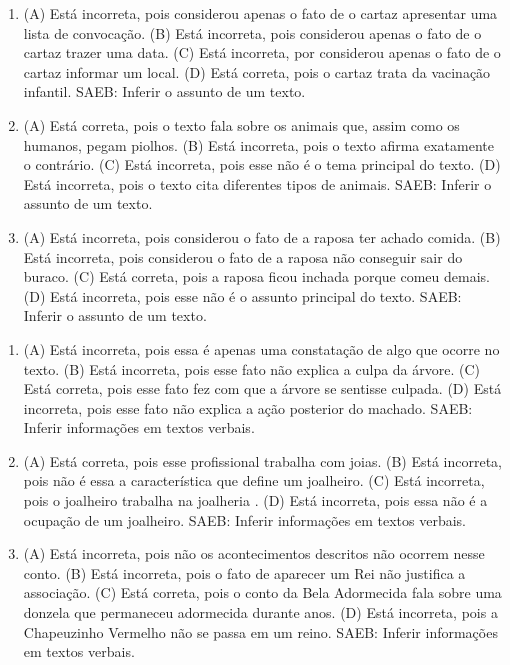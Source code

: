 
\begin{enumerate}
\item
(A) Está incorreta, pois considerou apenas o fato de o cartaz apresentar uma lista de convocação.
(B) Está incorreta, pois considerou apenas o fato de o cartaz trazer uma data.
(C) Está incorreta, por considerou apenas o fato de o cartaz informar um local.
(D) Está correta, pois o cartaz trata da vacinação infantil.
SAEB: Inferir o assunto de um texto.

\item
(A) Está correta, pois o texto fala sobre os animais que, assim como os humanos, pegam piolhos.
(B) Está incorreta, pois o texto afirma exatamente o contrário.
(C) Está incorreta, pois esse não é o tema principal do texto.
(D) Está incorreta, pois o texto cita diferentes tipos de animais.
SAEB: Inferir o assunto de um texto.

\item
(A) Está incorreta, pois considerou o fato de a raposa ter achado comida.
(B) Está incorreta, pois considerou o fato de a raposa não conseguir
sair do buraco.
(C) Está correta, pois a raposa ficou inchada porque comeu demais.
(D) Está incorreta, pois esse não é o assunto principal do texto.
SAEB: Inferir o assunto de um texto.
\end{enumerate}


\begin{enumerate}
\item
(A) Está incorreta, pois essa é apenas uma constatação de algo que ocorre no texto.
(B) Está incorreta, pois esse fato não explica a culpa da árvore.
(C) Está correta, pois esse fato fez com que a árvore se sentisse culpada.
(D) Está incorreta, pois esse fato não explica a ação posterior do machado.
SAEB: Inferir informações em textos verbais.

\item
(A) Está correta, pois esse profissional trabalha com joias.
(B) Está incorreta, pois não é essa a característica que define um joalheiro.
(C) Está incorreta, pois o joalheiro trabalha na joalheria .
(D) Está incorreta, pois essa não é a ocupação de um joalheiro.
SAEB: Inferir informações em textos verbais.

\item
(A) Está incorreta, pois não os acontecimentos descritos não ocorrem nesse conto.
(B) Está incorreta, pois o fato de aparecer um Rei não justifica a associação.
(C) Está correta, pois o conto da Bela Adormecida fala sobre uma donzela que permaneceu adormecida durante anos.
(D) Está incorreta, pois a Chapeuzinho Vermelho não se passa em um reino.
SAEB: Inferir informações em textos verbais.
\end{enumerate}

